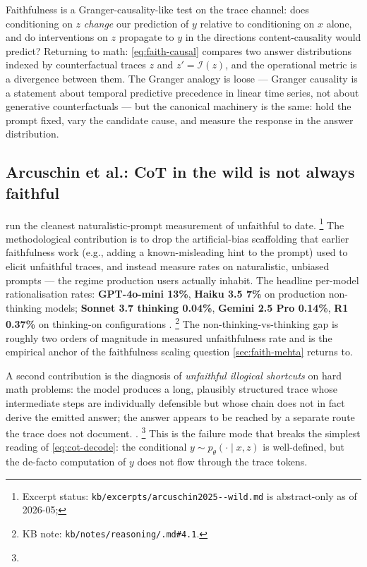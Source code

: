 \begin{intuition}
Faithfulness is a Granger-causality-like test on the trace channel:
does conditioning on $z$ \emph{change} our prediction of $y$ relative
to conditioning on $x$ alone, and do interventions on $z$ propagate
to $y$ in the directions content-causality would predict? Returning
to math: \cref{eq:faith-causal} compares two answer distributions
indexed by counterfactual traces $z$ and $z' = \mathcal{I}(z)$, and
the operational metric is a divergence between them. The Granger
analogy is loose — Granger causality is a statement about temporal
predictive precedence in linear time series, not about generative
counterfactuals — but the canonical machinery is the same: hold the
prompt fixed, vary the candidate cause, and measure the response in
the answer distribution.
\end{intuition}

\subsection{Arcuschin et al.: CoT in the wild is not always faithful}
\label{sec:faith-arcuschin}

\citet{arcuschin2025-cot-wild} run the cleanest naturalistic-prompt
measurement of unfaithful  to date.%
\footnote{Excerpt status:
\texttt{kb/excerpts/arcuschin2025--wild.md} is abstract-only as of
2026-05; } The methodological contribution is to drop the
artificial-bias scaffolding that earlier faithfulness work
(e.g., adding a known-misleading hint to the prompt) used to elicit
unfaithful traces, and instead measure rates on naturalistic, unbiased
prompts — the regime production users actually inhabit. The headline
per-model rationalisation rates: \textbf{GPT-4o-mini 13\%},
\textbf{Haiku 3.5 7\%} on production non-thinking models;
\textbf{Sonnet 3.7 thinking 0.04\%}, \textbf{Gemini 2.5 Pro 0.14\%},
\textbf{R1 0.37\%} on thinking-on configurations
\citep[abstract]{arcuschin2025-cot-wild}.%
\footnote{KB note:
\texttt{kb/notes/reasoning/.md\#4.1}.} The
non-thinking-vs-thinking gap is roughly two orders of magnitude in
measured unfaithfulness rate and is the empirical anchor of the
faithfulness scaling question \cref{sec:faith-mehta} returns to.

A second contribution is the diagnosis of \emph{unfaithful illogical
shortcuts} on hard math problems: the model produces a long, plausibly
structured trace whose intermediate steps are individually defensible
but whose chain does not in fact derive the emitted answer; the answer
appears to be reached by a separate route the trace does not document.
\citep[\S 4]{arcuschin2025-cot-wild}.%
\footnote{}
This is the failure mode that breaks the simplest reading of
\cref{eq:cot-decode}: the conditional $y \sim p_\theta(\cdot \mid x,
z)$ is well-defined, but the de-facto computation of $y$ does not
flow through the trace tokens.

